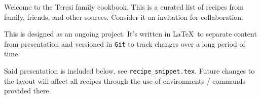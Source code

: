 Welcome to the Teresi family cookbook.
This is a curated list of recipes from family, friends, and other sources.
Consider it an invitation for collaboration.

This is designed as an ongoing project.
It's written in \LaTeX\ to separate content from presentation and versioned in \texttt{Git} to track changes over a long period of time.

Said presentation is included below, see \texttt{recipe\_snippet.tex}.
Future changes to the layout will affect all recipes through the use of environments / commands provided there.
